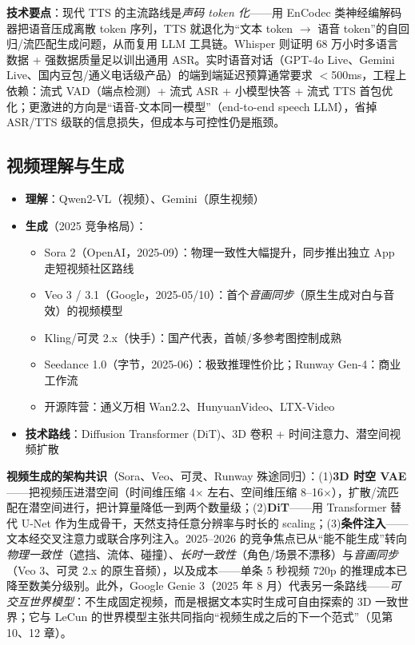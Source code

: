 \documentclass[12pt,a4paper]{article}
\begin{document}
\textbf{技术要点}：现代 TTS 的主流路线是\emph{声码 token 化}——用 EnCodec 类神经编解码器把语音压成离散 token 序列，TTS 就退化为“文本 token $\to$ 语音 token”的自回归/流匹配生成问题，从而复用 LLM 工具链。Whisper 则证明 68 万小时多语言数据 + 强数据质量足以训出通用 ASR。实时语音对话（GPT-4o Live、Gemini Live、国内豆包/通义电话级产品）的端到端延迟预算通常要求 $<$500ms，工程上依赖：流式 VAD（端点检测）+ 流式 ASR + 小模型快答 + 流式 TTS 首包优化；更激进的方向是“语音-文本同一模型”（end-to-end speech LLM），省掉 ASR/TTS 级联的信息损失，但成本与可控性仍是瓶颈。

\subsection{视频理解与生成}

\begin{itemize}
  \item \textbf{理解}：Qwen2-VL（视频）、Gemini（原生视频）
  \item \textbf{生成}（2025 竞争格局）：
  \begin{itemize}
    \item Sora 2（OpenAI，2025-09）：物理一致性大幅提升，同步推出独立 App 走短视频社区路线
    \item Veo 3 / 3.1（Google，2025-05/10）：首个\emph{音画同步}（原生生成对白与音效）的视频模型
    \item Kling/可灵 2.x（快手）：国产代表，首帧/多参考图控制成熟
    \item Seedance 1.0（字节，2025-06）：极致推理性价比；Runway Gen-4：商业工作流
    \item 开源阵营：通义万相 Wan2.2、HunyuanVideo、LTX-Video
  \end{itemize}
  \item \textbf{技术路线}：Diffusion Transformer (DiT)、3D 卷积 + 时间注意力、潜空间视频扩散
\end{itemize}

\textbf{视频生成的架构共识}（Sora、Veo、可灵、Runway 殊途同归）：(1)\textbf{3D 时空 VAE}——把视频压进潜空间（时间维压缩 4$\times$ 左右、空间维压缩 8--16$\times$），扩散/流匹配在潜空间进行，把计算量降低一到两个数量级；(2)\textbf{DiT}——用 Transformer 替代 U-Net 作为生成骨干，天然支持任意分辨率与时长的 scaling；(3)\textbf{条件注入}——文本经交叉注意力或联合序列注入。2025--2026 的竞争焦点已从“能不能生成”转向\emph{物理一致性}（遮挡、流体、碰撞）、\emph{长时一致性}（角色/场景不漂移）与\emph{音画同步}（Veo 3、可灵 2.x 的原生音频），以及成本——单条 5 秒视频 720p 的推理成本已降至数美分级别。此外，Google Genie 3（2025 年 8 月）代表另一条路线——\emph{可交互世界模型}：不生成固定视频，而是根据文本实时生成可自由探索的 3D 一致世界；它与 LeCun 的世界模型主张共同指向“视频生成之后的下一个范式”（见第 10、12 章）。
\end{document}
